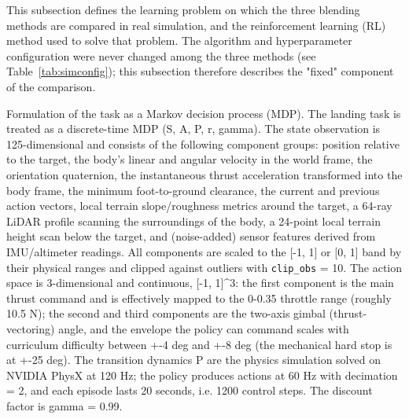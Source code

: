 This subsection defines the learning problem on which the three blending methods are compared in real simulation, and the reinforcement learning (RL) method used to solve that problem. The algorithm and hyperparameter configuration were never changed among the three methods (see Table~\ref{tab:simconfig}); this subsection therefore describes the "fixed" component of the comparison.

Formulation of the task as a Markov decision process (MDP). The landing task is treated as a discrete-time MDP (S, A, P, r, gamma). The state observation is 125-dimensional and consists of the following component groups: position relative to the target, the body's linear and angular velocity in the world frame, the orientation quaternion, the instantaneous thrust acceleration transformed into the body frame, the minimum foot-to-ground clearance, the current and previous action vectors, local terrain slope/roughness metrics around the target, a 64-ray LiDAR profile scanning the surroundings of the body, a 24-point local terrain height scan below the target, and (noise-added) sensor features derived from IMU/altimeter readings. All components are scaled to the [-1, 1] or [0, 1] band by their physical ranges and clipped against outliers with \texttt{clip\_obs} = 10. The action space is 3-dimensional and continuous, [-1, 1]\textasciicircum{}3: the first component is the main thrust command and is effectively mapped to the 0-0.35 throttle range (roughly 10.5 N); the second and third components are the two-axis gimbal (thrust-vectoring) angle, and the envelope the policy can command scales with curriculum difficulty between +-4 deg and +-8 deg (the mechanical hard stop is at +-25 deg). The transition dynamics P are the physics simulation solved on NVIDIA PhysX at 120 Hz; the policy produces actions at 60 Hz with decimation = 2, and each episode lasts 20 seconds, i.e. 1200 control steps. The discount factor is gamma = 0.99.

